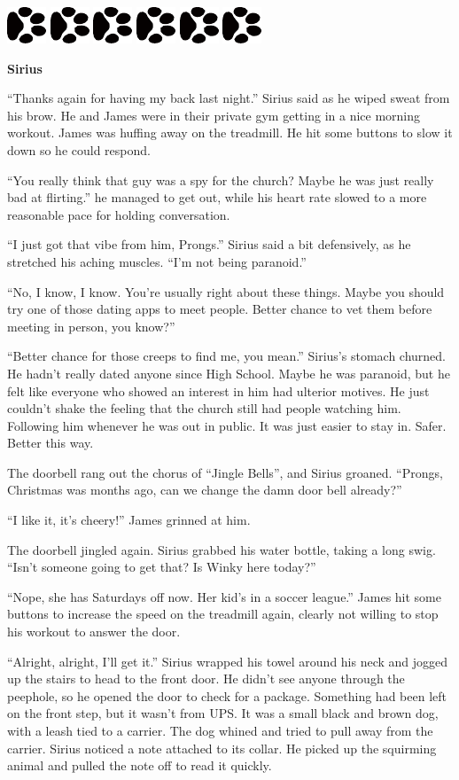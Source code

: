 \documentclass[12pt,twoside,openright]{memoir}
\newcommand{\myrulez}{	
	\begin{center}
		\hspace{.5em}
		\includegraphics[angle=60]{dogprint.pdf}
		\hspace{.5em}
		\includegraphics[angle=120]{dogprint.pdf}
		\hspace{.5em}
		\includegraphics[angle=60]{dogprint.pdf}
		\hspace{.5em}
		\includegraphics[angle=120]{dogprint.pdf}
		\hspace{.5em}
		\includegraphics[angle=60]{dogprint.pdf}
		\hspace{.5em}
		\includegraphics[angle=120]{dogprint.pdf}
		\hspace{.5em}
	\end{center}
}
\begin{document}
\myrulez

\textbf{Sirius} 

``Thanks again for having my back last night.'' Sirius said as he wiped sweat from his brow. He and James were in their private gym getting in a nice morning workout. James was huffing away on the treadmill. He hit some buttons to slow it down so he could respond.

``You really think that guy was a spy for the church? Maybe he was just really bad at flirting.'' he managed to get out, while his heart rate slowed to a more reasonable pace for holding conversation.

``I just got that vibe from him, Prongs.'' Sirius said a bit defensively, as he stretched his aching muscles. ``I'm not being paranoid.''

``No, I know, I know. You're usually right about these things. Maybe you should try one of those dating apps to meet people. Better chance to vet them before meeting in person, you know?''

``Better chance for those creeps to find me, you mean.'' Sirius's stomach churned. He hadn't really dated anyone since High School. Maybe he was paranoid, but he felt like everyone who showed an interest in him had ulterior motives. He just couldn't shake the feeling that the church still had people watching him. Following him whenever he was out in public. It was just easier to stay in. Safer. Better this way.

The doorbell rang out the chorus of ``Jingle Bells'', and Sirius groaned. ``Prongs, Christmas was months ago, can we change the damn door bell already?''

``I like it, it's cheery!'' James grinned at him. 

The doorbell jingled again. Sirius grabbed his water bottle, taking a long swig. ``Isn't someone going to get that? Is Winky here today?''

``Nope, she has Saturdays off now. Her kid's in a soccer league.'' James hit some buttons to increase the speed on the treadmill again, clearly not willing to stop his workout to answer the door.

``Alright, alright, I'll get it.'' Sirius wrapped his towel around his neck and jogged up the stairs to head to the front door. He didn't see anyone through the peephole, so he opened the door to check for a package. Something had been left on the front step, but it wasn't from UPS. It was a small black and brown dog, with a leash tied to a carrier. The dog whined and tried to pull away from the carrier. Sirius noticed a note attached to its collar. He picked up the squirming animal and pulled the note off to read it quickly.
\end{document}
